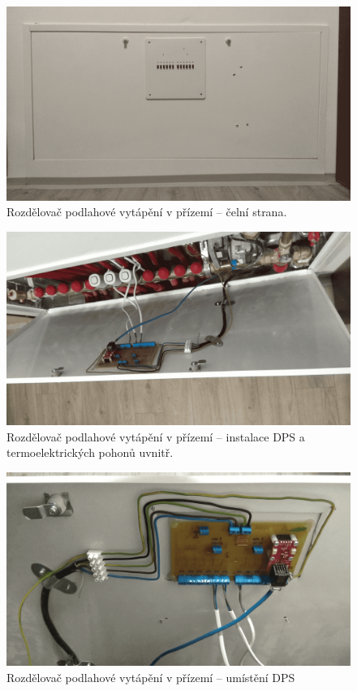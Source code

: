 \begin{figure}[H]
    \centering
    \includegraphics[width=\textwidth]{images/rozdelovac-prizemi/rozdelovac-prizemi-celni-strana.png}
    \caption{Rozdělovač podlahové vytápění v přízemí – čelní strana.}
    \label{fig:rozdelovac-prizemi-celni-strana}
\end{figure}

\begin{figure}[H]
    \centering
    \includegraphics[width=\textwidth]{images/rozdelovac-prizemi/rozdelovac-prizemi.png}
    \caption{Rozdělovač podlahové vytápění v přízemí  – instalace DPS a termoelektrických pohonů uvnitř.}
    \label{fig:rozdelovac-prizemi}
\end{figure}

\begin{figure}[H]
    \centering
    \includegraphics[width=\textwidth]{images/rozdelovac-prizemi/rozdelovac-prizemi-umisteni-dps.png}
    \caption{Rozdělovač podlahové vytápění v přízemí – umístění DPS}
    \label{fig:rozdelovac-prizemi-umisteni-dps}
\end{figure}